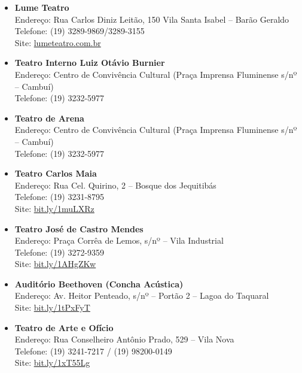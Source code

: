 \begin{itemize}
    \item   \textbf{Lume Teatro}
        \\Endereço:  Rua Carlos Diniz Leitão, 150 Vila Santa Isabel -- Barão
        Geraldo
        \\Telefone: (19) 3289-9869/3289-3155
        \\Site: \url{lumeteatro.com.br}

    \item   \textbf{Teatro Interno Luiz Otávio Burnier}
        \\Endereço: Centro de Convivência Cultural (Praça Imprensa Fluminense
        s/nº -- Cambuí)
        \\Telefone: (19) 3232-5977 %

    \item   \textbf{Teatro de Arena}
        \\Endereço: Centro de Convivência Cultural (Praça Imprensa Fluminense
        s/nº -- Cambuí)
        \\Telefone: (19) 3232-5977

    \item   \textbf{Teatro Carlos Maia}
        \\Endereço: Rua Cel. Quirino, 2 -- Bosque dos Jequitibás
        \\Telefone: (19) 3231-8795
        \\Site: \url{bit.ly/1muLXRz}

    \item   \textbf{Teatro José de Castro Mendes}
        \\Endereço: Praça Corrêa de Lemos, s/nº -- Vila Industrial
        \\Telefone: (19) 3272-9359
        \\Site: \url{bit.ly/1AHgZKw}

    \item   \textbf{Auditório Beethoven (Concha Acústica)}
        \\Endereço: Av. Heitor Penteado, s/nº -- Portão 2 -- Lagoa do Taquaral
        \\Site: \url{bit.ly/1tPxFyT}

    \item   \textbf{Teatro de Arte e Ofício}
        \\Endereço: Rua Conselheiro Antônio Prado, 529 -- Vila Nova
        \\Telefone: (19) 3241-7217 / (19) 98200-0149
        \\Site: \url{bit.ly/1xT55Lg}


\end{itemize}
